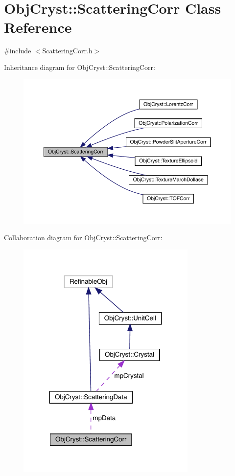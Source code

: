 \hypertarget{class_obj_cryst_1_1_scattering_corr}{}\section{Obj\+Cryst\+::Scattering\+Corr Class Reference}
\label{class_obj_cryst_1_1_scattering_corr}


{\ttfamily \#include $<$Scattering\+Corr.\+h$>$}



Inheritance diagram for Obj\+Cryst\+::Scattering\+Corr\+:
\nopagebreak
\begin{figure}[H]
\begin{center}
\leavevmode
\includegraphics[width=350pt]{class_obj_cryst_1_1_scattering_corr__inherit__graph}
\end{center}
\end{figure}


Collaboration diagram for Obj\+Cryst\+::Scattering\+Corr\+:
\nopagebreak
\begin{figure}[H]
\begin{center}
\leavevmode
\includegraphics[width=251pt]{class_obj_cryst_1_1_scattering_corr__coll__graph}
\end{center}
\end{figure}
